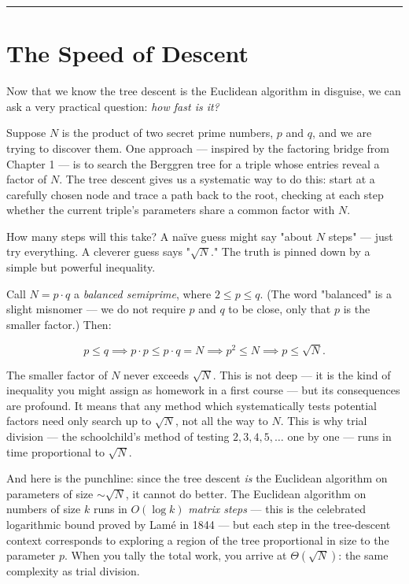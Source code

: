 \documentclass[12pt, letterpaper, openany]{book}
\theoremstyle{definition}
\theoremstyle{remark}
\begin{document}
\bigskip\noindent\rule{\textwidth}{0.4pt}\bigskip



\section*{The Speed of Descent}


Now that we know the tree descent is the Euclidean algorithm in disguise, we can ask a very practical question: \textit{how fast is it?}

Suppose $N$ is the product of two secret prime numbers, $p$ and $q$, and we are trying to discover them. One approach --- inspired by the factoring bridge from Chapter 1 --- is to search the Berggren tree for a triple whose entries reveal a factor of $N$. The tree descent gives us a systematic way to do this: start at a carefully chosen node and trace a path back to the root, checking at each step whether the current triple's parameters share a common factor with $N$.

How many steps will this take? A naïve guess might say "about $N$ steps" --- just try everything. A cleverer guess says "$\sqrt{N}$." The truth is pinned down by a simple but powerful inequality.

Call $N = p \cdot q$ a \textit{balanced semiprime}, where $2 \le p \le q$. (The word "balanced" is a slight misnomer --- we do not require $p$ and $q$ to be close, only that $p$ is the smaller factor.) Then:

\[
p \le q \implies p \cdot p \le p \cdot q = N \implies p^2 \le N \implies p \le \sqrt{N}.
\]

The smaller factor of $N$ never exceeds $\sqrt{N}$. This is not deep --- it is the kind of inequality you might assign as homework in a first course --- but its consequences are profound. It means that any method which systematically tests potential factors need only search up to $\sqrt{N}$, not all the way to $N$. This is why trial division --- the schoolchild's method of testing $2, 3, 4, 5, \ldots$ one by one --- runs in time proportional to $\sqrt{N}$.

And here is the punchline: since the tree descent \textit{is} the Euclidean algorithm on parameters of size $\sim\!\sqrt{N}$, it cannot do better. The Euclidean algorithm on numbers of size $k$ runs in $O(\log k)$ \textit{matrix steps} --- this is the celebrated logarithmic bound proved by Lamé in 1844 --- but each step in the tree-descent context corresponds to exploring a region of the tree proportional in size to the parameter $p$. When you tally the total work, you arrive at $\Theta(\sqrt{N})$: the same complexity as trial division.
\end{document}
